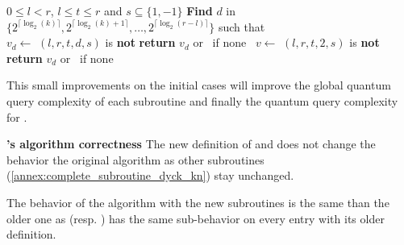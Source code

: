 \begin{algorithm}
    \caption{$\FFP{k}(l,r,t,s)$}\label{alg:ffp_better}
    \begin{algorithmic}
        \Require $0\leq l<r$, $l \leq t \leq r$ and $s \subseteq \{1, -1\}$
        \State \textbf{Find} $d$ in $\{2^{\lceil \log_2(k)\rceil }, 2^{\lceil \log_2(k)+1\rceil },\ldots,2^{\lceil \log_2(r-l)\rceil }\}$
        such that \\
        \hspace*{1cm} $v_d \gets $ $(l,r,t,d,s)$ is \textbf{not} \Null
        \State \textbf{return} $v_d$ or \Null \ if none
        \Else
        \ $v \gets $ $(l,r,t,2,s)$ is \textbf{not} \Null
        \State \textbf{return} $v_d$ or \Null \ if none
        \EndIf
    \end{algorithmic}
\end{algorithm}

This small improvements on the initial cases will improve the global
quantum query complexity of each subroutine and finally the quantum
query complexity for .

\newpage

\begin{theorem}{\textbf{'s algorithm correctness}} \label{th:subroutine_correctness}
    The new definition of \FA{} and \FFP{} does not change the behavior the original algorithm
    as other subroutines (\autoref{annex:complete_subroutine_dyck_kn}) stay unchanged.
\end{theorem}

\begin{tproof}
    The behavior of the  algorithm with the new subroutines is the same than the older
    one as \FA{} (resp. \FF{}) has the same sub-behavior on every entry with its
    older definition.
\end{tproof}

